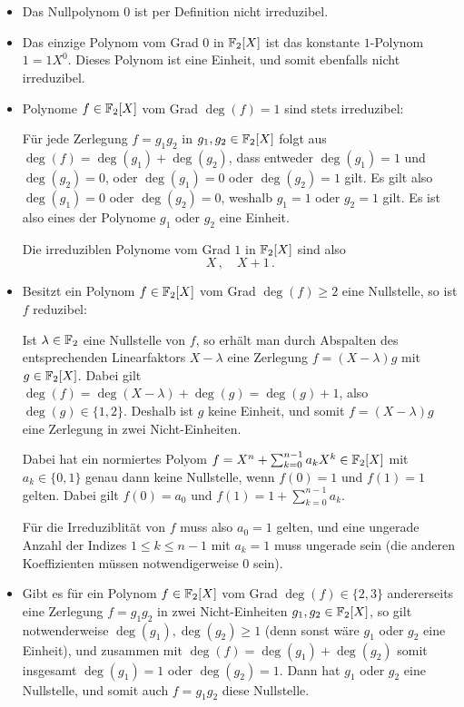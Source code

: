 \section{}





\subsection{}

\begin{itemize}
  \item
    Das Nullpolynom $0$ ist per Definition nicht irreduzibel.
  \item
    Das einzige Polynom vom Grad $0$ in $\mathbb{F}_2[X]$ ist das konstante $1$-Polynom $1 = 1 X^0$.
    Dieses Polynom ist eine Einheit, und somit ebenfalls nicht irreduzibel.
  \item
    Polynome $f \in \mathbb{F}_2[X]$ vom Grad $\deg(f) = 1$ sind stets irreduzibel:
    
    Für jede Zerlegung $f = g_1 g_2$ in $g_1, g_2 \in \mathbb{F}_2[X]$ folgt aus $\deg(f) = \deg(g_1) + \deg(g_2)$, dass entweder $\deg(g_1) = 1$ und $\deg(g_2) = 0$, oder $\deg(g_1) = 0$ oder $\deg(g_2) = 1$ gilt.
    Es gilt also $\deg(g_1) = 0$ oder $\deg(g_2) = 0$, weshalb $g_1 = 1$ oder $g_2 = 1$ gilt.
    Es ist also eines der Polynome $g_1$ oder $g_2$ eine Einheit.
    
    Die irreduziblen Polynome vom Grad $1$ in $\mathbb{F}_2[X]$ sind also
    \[
      X \,,
      \quad
      X + 1 \,.
    \]

  \item
    Besitzt ein Polynom $f \in \mathbb{F}_2[X]$ vom Grad $\deg(f) \geq 2$ eine Nullstelle, so ist $f$ reduzibel:
    
    Ist $\lambda \in \mathbb{F}_2$ eine Nullstelle von $f$, so erhält man durch Abspalten des entsprechenden Linearfaktors $X - \lambda$ eine Zerlegung $f = (X - \lambda) g$ mit $g \in \mathbb{F}_2[X]$.
    Dabei gilt $\deg(f) = \deg(X-\lambda) + \deg(g) = \deg(g) + 1$, also $\deg(g) \in \{1, 2\}$.
    Deshalb ist $g$ keine Einheit, und somit $f = (X-\lambda)g$ eine Zerlegung in zwei Nicht-Einheiten.

    Dabei hat ein normiertes Polyom $f = X^n + \sum_{k=0}^{n-1} a_k X^k \in \mathbb{F}_2[X]$ mit $a_k \in \{0,1\}$ genau dann keine Nullstelle, wenn $f(0) = 1$ und $f(1) = 1$ gelten.
    Dabei gilt $f(0) = a_0$ und $f(1) = 1 + \sum_{k=0}^{n-1} a_k$.
    
    Für die Irreduziblität von $f$ muss also $a_0 = 1$ gelten, und eine ungerade Anzahl der Indizes $1 \leq k \leq n-1$ mit $a_k = 1$ muss ungerade sein (die anderen Koeffizienten müssen notwendigerweise $0$ sein).
  \item
    Gibt es für ein Polynom $f \in \mathbb{F}_2[X]$ vom Grad $\deg(f) \in \{2,3\}$ andererseits eine Zerlegung $f = g_1 g_2$ in zwei Nicht-Einheiten $g_1, g_2 \in \mathbb{F}_2[X]$, so gilt notwenderweise $\deg(g_1), \deg(g_2) \geq 1$ (denn sonst wäre $g_1$ oder $g_2$ eine Einheit), und zusammen mit $\deg(f) = \deg(g_1) + \deg(g_2)$ somit insgesamt $\deg(g_1) = 1$ oder $\deg(g_2) = 1$.
    Dann hat $g_1$ oder $g_2$ eine Nullstelle, und somit auch $f = g_1 g_2$ diese Nullstelle.
    

\end{itemize}
